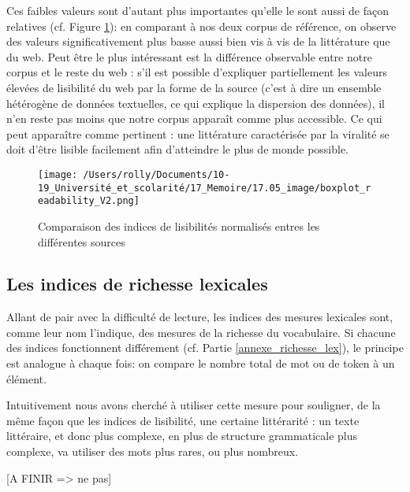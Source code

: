 \documentclass[12pt,a4paper,oneside,titlepage]{book} %
\begin{document}
	
	Ces faibles valeurs sont d'autant plus importantes qu'elle le sont aussi de façon relatives (cf. Figure \ref{fig:comparaison_readability}): en comparant à nos deux corpus de référence, on observe des valeurs significativement plus basse aussi bien vis à vis de la littérature que du web. Peut être le plus intéressant est la différence observable entre notre corpus et le reste du web : s'il est possible d'expliquer partiellement les valeurs élevées de lisibilité du web par la forme de la source (c'est à dire un ensemble hétérogène de données textuelles, ce qui explique la dispersion des données), il n'en reste pas moins que notre corpus apparaît comme plus accessible. Ce qui peut  apparaître comme pertinent : une littérature caractérisée par la viralité se doit d'être lisible facilement afin d'atteindre le plus de monde possible. 
	
	
	
	\begin{figure}
		\centering
		\texttt{[image: /Users/rolly/Documents/10-19\_Université\_et\_scolarité/17\_Memoire/17.05\_image/boxplot\_readability\_V2.png]}
		\caption{Comparaison des indices de lisibilités normalisés entres les différentes sources}
		\label{fig:comparaison_readability}
	\end{figure}
	
\pagebreak
	
	
	
	\subsection{Les indices de richesse lexicales}
Allant de pair avec la difficulté de lecture, les indices des mesures lexicales sont, comme leur nom l'indique, des mesures de la richesse du vocabulaire. Si chacune des indices fonctionnent différement (cf. Partie  \ref{annexe_richesse_lex}), le principe est analogue à chaque fois: on compare le nombre total de mot ou de token à un élément. 

Intuitivement nous avons cherché à utiliser cette mesure pour souligner, de la même façon que les indices de lisibilité, une certaine littérarité : un texte littéraire, et donc plus complexe, en plus de structure grammaticale plus complexe, va utiliser des mots plus rares, ou plus nombreux. 

[A FINIR => ne pas]
\end{document}
